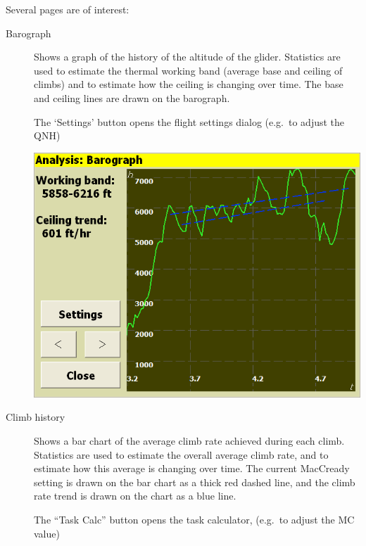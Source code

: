 \documentclass[a4paper,12pt]{refrep}
\begin{document}
Several pages are of interest:
\begin{description}
\item[Barograph]  Shows a graph of the history of the altitude of the glider.
  Statistics are used to estimate the thermal working band (average
  base and ceiling of climbs) and to estimate how the ceiling is
  changing over time.  The base and ceiling lines are drawn on the
  barograph.

  The `Settings' button opens the flight settings dialog
  (e.g.\ to adjust the QNH)

\begin{center}
\includegraphics[angle=0,width=\linewidth,keepaspectratio='true']{figures/analysis-barograph.png}
\end{center}

\item[Climb history]
  Shows a bar chart of the average climb rate achieved during each
  climb.  Statistics are used to estimate the overall average climb
  rate, and to estimate how this average is changing over time.  The
  current MacCready setting is drawn on the bar chart as a thick red
  dashed line, and the climb rate trend is drawn on the chart as a
  blue line.

  The ``Task Calc'' button opens the task calculator,
  (e.g.\ to adjust the MC value)


\end{description}
\end{document}

